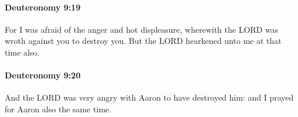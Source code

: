 		\paragraph{Deuteronomy 9:19} %
			\label{DEUTERONOMY-9-19}

			For I was afraid of the anger and hot displeasure, wherewith the LORD was wroth against you to destroy you. But the LORD hearkened unto me at that time also.


		\paragraph{Deuteronomy 9:20} %
			\label{DEUTERONOMY-9-20}

			And the LORD was very angry with Aaron to have destroyed him: and I prayed for Aaron also the same time.


